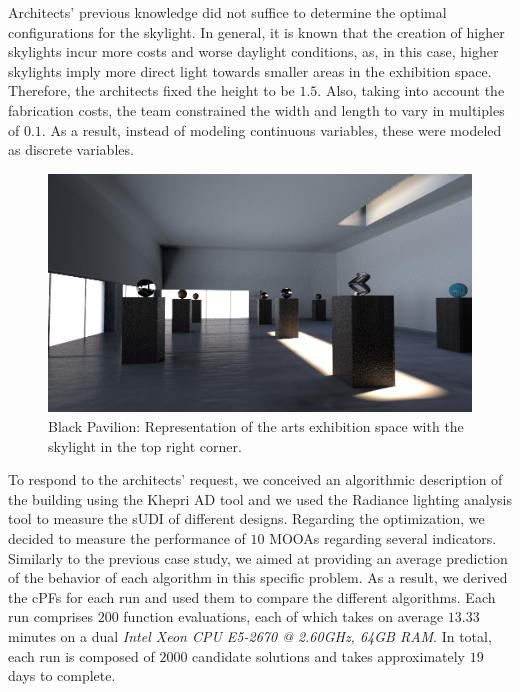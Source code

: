Architects' previous knowledge did not suffice to determine the optimal configurations for the skylight. In general, it is known that the creation of higher skylights incur more costs and worse daylight conditions, as, in this case, higher skylights imply more direct light towards smaller areas in the exhibition space. Therefore, the architects fixed the height to be $1.5$\metre. Also, taking into account the fabrication costs, the team constrained the width and length to vary in multiples of $0.1$\metre. As a result, instead of modeling continuous variables, these were modeled as discrete variables.
\begin{figure}[h!]
	\centering
	\includegraphics[width=\textwidth]{Images/Evaluation/BlackPavilion/PavPretoExample116x7204.png}
	\caption[Black Pavilion: Representation of the arts exhibition space with a skylight]{Black Pavilion: Representation of the arts exhibition space with the skylight in the top right corner.}
	\label{fig:blackpavilion}
\end{figure}

To respond to the architects' request, we conceived an algorithmic description of the building using the Khepri \ac{AD} tool and we used the Radiance lighting analysis tool to measure the \ac{sUDI} of different designs. Regarding the optimization, we decided to measure the performance of $10$ \acp{MOOA} regarding several indicators. Similarly to the previous case study, we aimed at providing an average prediction of the behavior of each algorithm in this specific problem. As a result, we derived the \acp{cPF} for each run and used them to compare the different algorithms. Each run comprises $200$ function evaluations, each of which takes on average $13.33$ minutes on a dual \textit{Intel Xeon CPU E5-2670 @ 2.60GHz, 64GB RAM}. In total, each run is composed of $2000$ candidate solutions and takes approximately $19$ days to complete.

